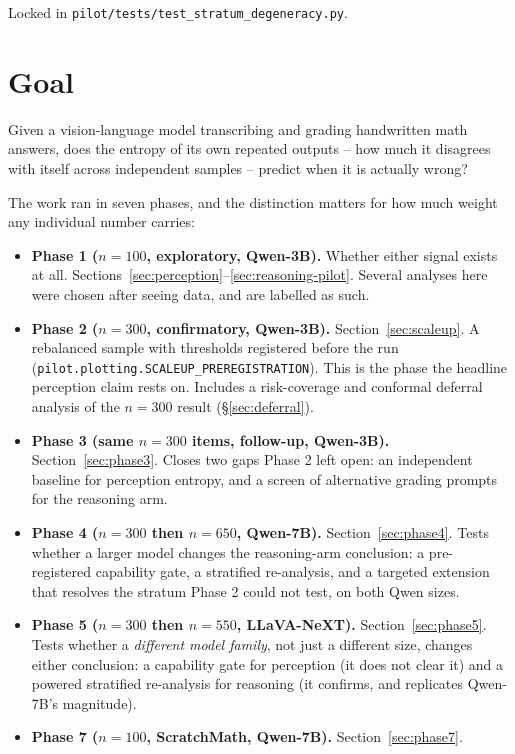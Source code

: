 \documentclass[11pt]{article}
\begin{document}
Locked in \texttt{pilot/tests/test\_stratum\_degeneracy.py}.

\section{Goal}

Given a vision-language model transcribing and grading handwritten math answers,
does the entropy of its own repeated outputs -- how much it disagrees with
itself across independent samples -- predict when it is actually wrong?

The work ran in seven phases, and the distinction matters for how much weight
any individual number carries:

\begin{itemize}
  \item \textbf{Phase 1 ($n=100$, exploratory, Qwen-3B).} Whether either
    signal exists at all. Sections~\ref{sec:perception}--\ref{sec:reasoning-pilot}.
    Several analyses here were chosen after seeing data, and are labelled as
    such.
  \item \textbf{Phase 2 ($n=300$, confirmatory, Qwen-3B).}
    Section~\ref{sec:scaleup}. A rebalanced sample with thresholds registered
    before the run (\texttt{pilot.plotting.SCALEUP\_PREREGISTRATION}). This is
    the phase the headline perception claim rests on. Includes a
    risk-coverage and conformal deferral analysis of the $n=300$ result
    (\S\ref{sec:deferral}).
  \item \textbf{Phase 3 (same $n=300$ items, follow-up, Qwen-3B).} Section~\ref{sec:phase3}.
    Closes two gaps Phase 2 left open: an independent baseline for perception
    entropy, and a screen of alternative grading prompts for the reasoning arm.
  \item \textbf{Phase 4 ($n=300$ then $n=650$, Qwen-7B).} Section~\ref{sec:phase4}.
    Tests whether a larger model changes the reasoning-arm conclusion: a
    pre-registered capability gate, a stratified re-analysis, and a targeted
    extension that resolves the stratum Phase 2 could not test, on both
    Qwen sizes.
  \item \textbf{Phase 5 ($n=300$ then $n=550$, LLaVA-NeXT).} Section~\ref{sec:phase5}.
    Tests whether a \emph{different model family}, not just a different
    size, changes either conclusion: a capability gate for perception (it
    does not clear it) and a powered stratified re-analysis for reasoning
    (it confirms, and replicates Qwen-7B's magnitude).
  \item \textbf{Phase 7 ($n=100$, ScratchMath, Qwen-7B).} Section~\ref{sec:phase7}.

\end{itemize}
\end{document}
